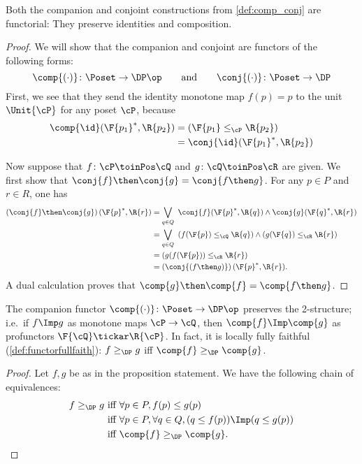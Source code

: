 \begin{proposition}\label{prop:comp_conj}
Both the companion and conjoint constructions from \cref{def:comp_conj} are functorial: They preserve identities and composition.
\end{proposition}
\begin{proof}
We will show that the companion and conjoint are functors of the following forms:
\begin{equation}
\comp{(\cdot)}\colon\Poset\to\DP\op
\qquad\text{and}\qquad
\conj{(\cdot)}\colon\Poset\to\DP
\end{equation}
First, we see that they send the identity monotone map $f(p)=p$ to the unit $\Unit{\cP }$ for any poset $\cP $, because 
\begin{equation}
    \begin{aligned}
        \comp{\id}(\F{p_1}^*,\R{p_2})&= (\F{p_1} \leq_{\cP} \R{p_2})\\
        &=\conj{\id}(\F{p_1}^*,\R{p_2})
    \end{aligned}
\end{equation}

Now suppose that $f\colon  \cP \toinPos \cQ $ and $g\colon \cQ \toinPos \cR$ are given. We first show that $\conj{f}\then\conj{g}=\conj{f\then g}$.
For any $p\in P$ and $r\in R$, one has
\begin{equation}
\begin{aligned}
	\left(\conj{f}\then \conj{g}\right)(\F{p}^*,\R{r})
	&=\bigvee_{q\in Q}\ \conj{f}(\F{p}^*,\R{q})\wedge\conj{g}(\F{q}^*,\R{r})\\
	&=\bigvee_{q\in Q}\ \left(f(\F{p}) \leq_\cQ \R{q} \right)\wedge \left(g(\F{q}) \leq_\cR \R{r}\right)\\
	&= \left( g(f(\F{p})) \leq_\cR \R{r} \right)\\
    &=\left(\conj{(f\then g)}\right)(\F{p}^*,\R{r}).
\end{aligned}
\end{equation}
A dual calculation proves that $\comp{g}\then \comp{f}=\comp{f\then g}$.
\end{proof}

\begin{proposition}\label{prop:companion_2}
The companion functor $\comp{(\cdot)}\colon\Poset\to\DP\op$ preserves the 2-structure; i.e.\ if $f\Imp g$ as monotone maps $\cP \to\cQ $, then $\comp{f}\Imp\comp{g}$ as profunctors $\F{\cQ} \tickar\R{\cP} $. In fact, it is locally fully faithful (\cref{def:functorfullfaith}): $f\geq_\DP g$ iff $\comp{f}\geq_\DP \comp{g}$.
\end{proposition}
\begin{proof}
Let $f,g$ be as in the proposition statement. We have the following chain of equivalences:
\begin{equation}
\begin{aligned}
	f\geq_\DP g&\text{ iff }
	\forall p\in P, f(p)\leq g(p)\\&\text{ iff }
	\forall p\in P, \forall q\in Q, (q\leq f(p))\Imp (q\leq g(p))\\&\text{ iff }
	\comp{f}\geq_\DP \comp{g}.
\end{aligned}
\end{equation}
\end{proof}

